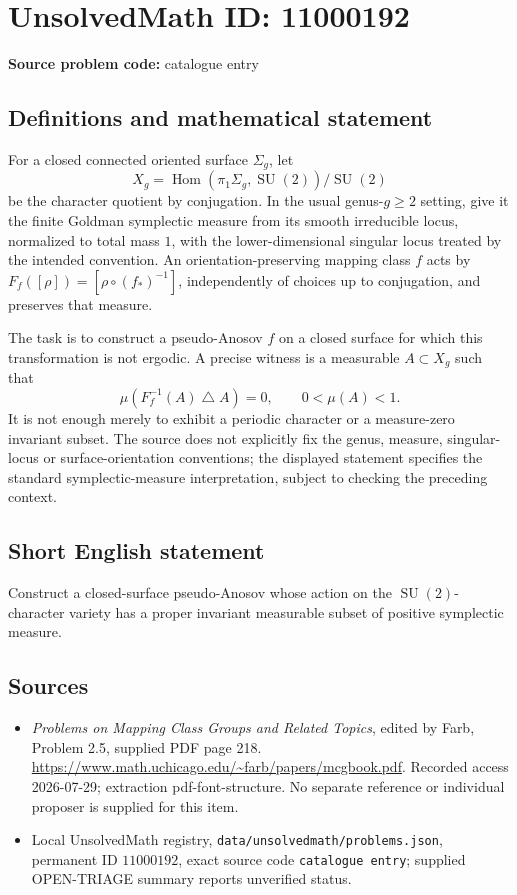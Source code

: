 \documentclass[11pt]{article}
\begin{document}
\section*{UnsolvedMath ID: 11000192}
\textbf{Source problem code:} catalogue entry
\subsection{Definitions and mathematical statement}
For a closed connected oriented surface \(\Sigma_g\), let
\[
 X_g=\operatorname{Hom}(\pi_1\Sigma_g,\operatorname{SU}(2))/\operatorname{SU}(2)
\]
be the character quotient by conjugation. In the usual genus-\(g\geq2\) setting, give it the finite Goldman symplectic measure from its smooth irreducible locus, normalized to total mass \(1\), with the lower-dimensional singular locus treated by the intended convention. An orientation-preserving mapping class \(f\) acts by
\(F_f([\rho])=[\rho\circ(f_*)^{-1}]\), independently of choices up to conjugation, and preserves that measure.

The task is to construct a pseudo-Anosov \(f\) on a closed surface for which this transformation is not ergodic. A precise witness is a measurable \(A\subset X_g\) such that
\[
 \mu(F_f^{-1}(A)\mathbin{\triangle}A)=0,
 \qquad0<\mu(A)<1.
\]
It is not enough merely to exhibit a periodic character or a measure-zero invariant subset. The source does not explicitly fix the genus, measure, singular-locus or surface-orientation conventions; the displayed statement specifies the standard symplectic-measure interpretation, subject to checking the preceding context.
\subsection{Short English statement}
Construct a closed-surface pseudo-Anosov whose action on the \(\operatorname{SU}(2)\)-character variety has a proper invariant measurable subset of positive symplectic measure.
\subsection{Sources}
\begin{itemize}
\item \emph{Problems on Mapping Class Groups and Related Topics}, edited by Farb, Problem 2.5, supplied PDF page 218. \url{https://www.math.uchicago.edu/~farb/papers/mcgbook.pdf}. Recorded access 2026-07-29; extraction pdf-font-structure. No separate reference or individual proposer is supplied for this item.
\item Local UnsolvedMath registry, \texttt{data/unsolvedmath/problems.json}, permanent ID \(11000192\), exact source code \texttt{catalogue entry}; supplied OPEN-TRIAGE summary reports unverified status.
\end{itemize}
\end{document}
